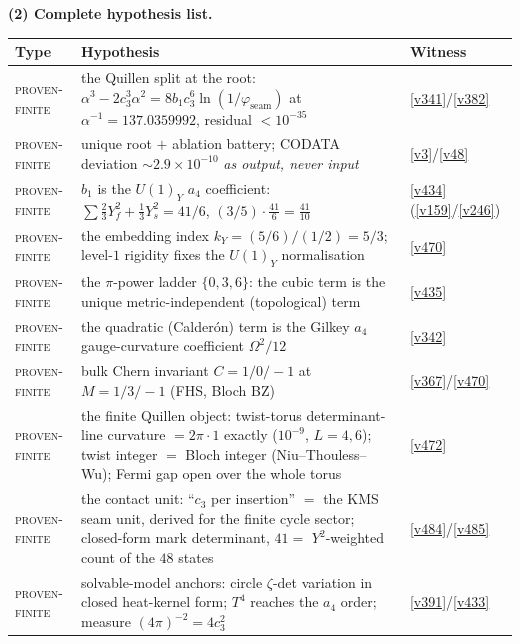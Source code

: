 \documentclass[11pt,a4paper]{article}
\newcommand{\cthree}{c_3}
\begin{document}
\par\smallskip\noindent\textbf{(2) Complete hypothesis list.}
\begin{center}\footnotesize
\renewcommand{\arraystretch}{1.22}
\begin{tabularx}{\linewidth}{@{}l>{\hsize=1.45\hsize\raggedright\arraybackslash}X>{\hsize=0.55\hsize\raggedright\arraybackslash}X@{}}
\toprule
\textbf{Type} & \textbf{Hypothesis} & \textbf{Witness} \\
\midrule
\textsc{proven-finite} & the Quillen split at the root: $\alpha^3-2\cthree^3\alpha^2=8b_1\cthree^6\ln(1/\varphi_{\mathrm{seam}})$ at $\alpha^{-1}=137.0359992$, residual $<10^{-35}$ & \vref{v341}/\vref{v382} \\
\textsc{proven-finite} & unique root $+$ ablation battery; CODATA deviation $\sim2.9\times10^{-10}$ \emph{as output, never input} & \vref{v3}/\vref{v48} \\
\textsc{proven-finite} & $b_1$ is the $U(1)_Y$ $a_4$ coefficient: $\sum\tfrac23Y_f^2+\tfrac13Y_s^2=41/6$, $(3/5)\cdot\tfrac{41}6=\tfrac{41}{10}$ & \vref{v434} (\vref{v159}/\vref{v246}) \\
\textsc{proven-finite} & the embedding index $k_Y=(5/6)/(1/2)=5/3$; level-$1$ rigidity fixes the $U(1)_Y$ normalisation & \vref{v470} \\
\textsc{proven-finite} & the $\pi$-power ladder $\{0,3,6\}$: the cubic term is the unique metric-independent (topological) term & \vref{v435} \\
\textsc{proven-finite} & the quadratic (Calder\'on) term is the Gilkey $a_4$ gauge-curvature coefficient $\Omega^2/12$ & \vref{v342} \\
\textsc{proven-finite} & bulk Chern invariant $C=1/0/-1$ at $M=1/3/-1$ (FHS, Bloch BZ) & \vref{v367}/\vref{v470} \\
\textsc{proven-finite} & the finite Quillen object: twist-torus determinant-line curvature $=2\pi\cdot1$ exactly ($10^{-9}$, $L=4,6$); twist integer $=$ Bloch integer (Niu--Thouless--Wu); Fermi gap open over the whole torus & \vref{v472} \\
\textsc{proven-finite} & the contact unit: ``$\cthree$ per insertion'' $=$ the KMS seam unit, derived for the finite cycle sector; closed-form mark determinant, $41=$ $Y^2$-weighted count of the $48$ states & \vref{v484}/\vref{v485} \\
\textsc{proven-finite} & solvable-model anchors: circle $\zeta$-det variation in closed heat-kernel form; $T^4$ reaches the $a_4$ order; measure $(4\pi)^{-2}=4\cthree^2$ & \vref{v391}/\vref{v433} \\

\end{tabularx}
\end{center}
\end{document}
